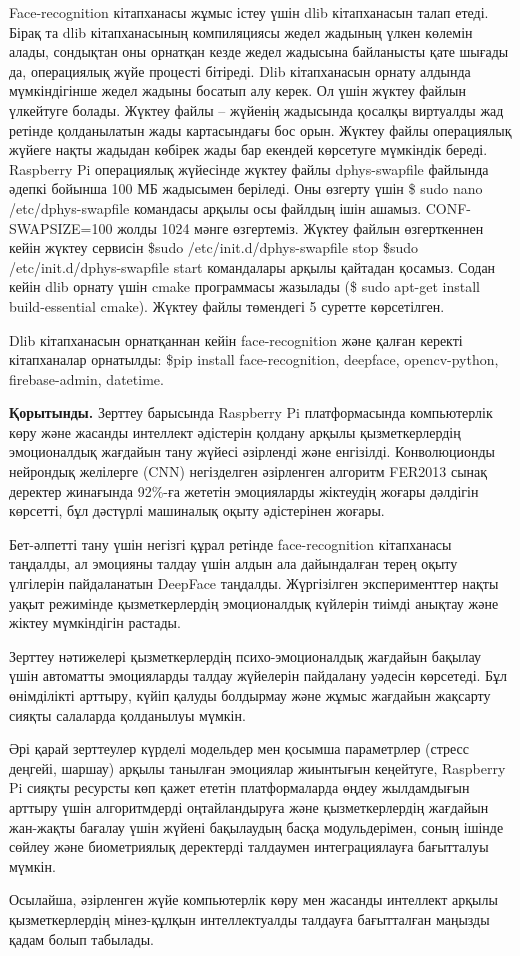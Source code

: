 \begin{multicols}{2}
Face-recognition кітапханасы жұмыс істеу үшін dlib кітапханасын талап
етеді. Бірақ та dlib кітапханасының компиляциясы жедел жадының үлкен
көлемін алады, сондықтан оны орнатқан кезде жедел жадысына байланысты
қате шығады да, операциялық жүйе процесті бітіреді. Dlib кітапханасын
орнату алдында мүмкіндігінше жедел жадыны босатып алу керек. Ол үшін
жүктеу файлын үлкейтуге болады. Жүктеу файлы -- жүйенің жадысында
қосалқы виртуалды жад ретінде қолданылатын жады картасындағы бос орын.
Жүктеу файлы операциялық жүйеге нақты жадыдан көбірек жады бар екендей
көрсетуге мүмкіндік береді. Raspberry Pi операциялық жүйесінде жүктеу
файлы dphys-swapfile файлында әдепкі бойынша 100 МБ жадысымен беріледі.
Оны өзгерту үшін \$ sudo nano /etc/dphys-swapfile командасы арқылы осы
файлдың ішін ашамыз. CONF-SWAPSIZE=100 жолды 1024 мәнге өзгертеміз.
Жүктеу файлын өзгерткеннен кейін жүктеу сервисін \$sudo
/etc/init.d/dphys-swapfile stop \$sudo /etc/init.d/dphys-swapfile start
командалары арқылы қайтадан қосамыз. Содан кейін dlib орнату үшін cmake
программасы жазылады (\$ sudo apt-get install build-essential cmake).
Жүктеу файлы төмендегі 5 суретте көрсетілген.

Dlib кітапханасын орнатқаннан кейін face-recognition және қалған керекті
кітапханалар орнатылды: \$pip install face-recognition, deepface,
opencv-python, firebase-admin, datetime.

{\bfseries Қорытынды.} Зерттеу барысында Raspberry Pi платформасында
компьютерлік көру және жасанды интеллект әдістерін қолдану арқылы
қызметкерлердің эмоционалдық жағдайын тану жүйесі әзірленді және
енгізілді. Конволюционды нейрондық желілерге (CNN) негізделген
әзірленген алгоритм FER2013 сынақ деректер жинағында 92\%-ға жететін
эмоцияларды жіктеудің жоғары дәлдігін көрсетті, бұл дәстүрлі машиналық
оқыту әдістерінен жоғары.

Бет-әлпетті тану үшін негізгі құрал ретінде face-recognition кітапханасы
таңдалды, ал эмоцияны талдау үшін алдын ала дайындалған терең оқыту
үлгілерін пайдаланатын DeepFace таңдалды. Жүргізілген эксперименттер
нақты уақыт режимінде қызметкерлердің эмоционалдық күйлерін тиімді
анықтау және жіктеу мүмкіндігін растады.

Зерттеу нәтижелері қызметкерлердің психо-эмоционалдық жағдайын бақылау
үшін автоматты эмоцияларды талдау жүйелерін пайдалану уәдесін көрсетеді.
Бұл өнімділікті арттыру, күйіп қалуды болдырмау және жұмыс жағдайын
жақсарту сияқты салаларда қолданылуы мүмкін.

Әрі қарай зерттеулер күрделі модельдер мен қосымша параметрлер (стресс
деңгейі, шаршау) арқылы танылған эмоциялар жиынтығын кеңейтуге,
Raspberry Pi сияқты ресурсты көп қажет ететін платформаларда өңдеу
жылдамдығын арттыру үшін алгоритмдерді оңтайландыруға және
қызметкерлердің жағдайын жан-жақты бағалау үшін жүйені бақылаудың басқа
модульдерімен, соның ішінде сөйлеу және биометриялық деректерді
талдаумен интеграциялауға бағытталуы мүмкін.

Осылайша, әзірленген жүйе компьютерлік көру мен жасанды интеллект арқылы
қызметкерлердің мінез-құлқын интеллектуалды талдауға бағытталған маңызды
қадам болып табылады.
\end{multicols}

